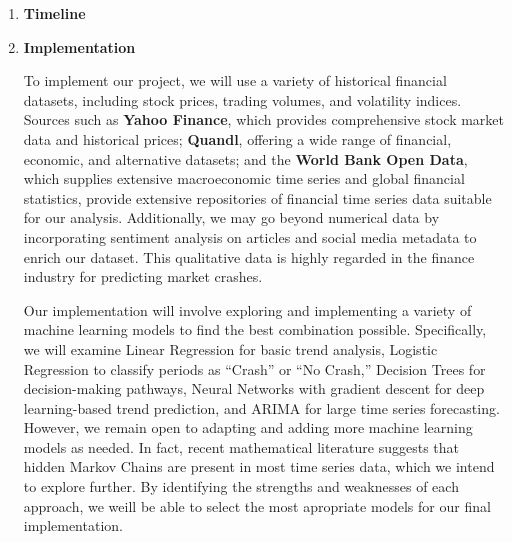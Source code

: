 \documentclass[12pt, letterpaper]{article}
\begin{document}
\begin{enumerate}[label=]
    \item \textbf{Timeline}
        
        
    \item \textbf{Implementation} %

    


To implement our project, we will use a variety of historical financial datasets, including stock prices, trading volumes, and volatility indices. Sources such as \textbf{Yahoo Finance}, which provides comprehensive stock market data and historical prices; \textbf{Quandl}, offering a wide range of financial, economic, and alternative datasets; and the \textbf{World Bank Open Data}, which supplies extensive macroeconomic time series and global financial statistics, provide extensive repositories of financial time series data suitable for our analysis. Additionally, we may go beyond numerical data by incorporating sentiment analysis on articles and social media metadata to enrich our dataset. This qualitative data is highly regarded in the finance industry for predicting market crashes.

Our implementation will involve exploring and implementing a variety of machine learning models to find the best combination possible. Specifically, we will examine Linear Regression for basic trend analysis, Logistic Regression to classify periods as “Crash” or “No Crash,” Decision Trees for decision-making pathways, Neural Networks with gradient descent for deep learning-based trend prediction, and ARIMA for large time series forecasting. However, we remain open to adapting and adding more machine learning models as needed. In fact, recent mathematical literature suggests that hidden Markov Chains are present in most time series data, which we intend to explore further. By identifying the strengths and weaknesses of each approach, we weill be able to select the most apropriate models for our final implementation.


\end{enumerate}
\end{document}
